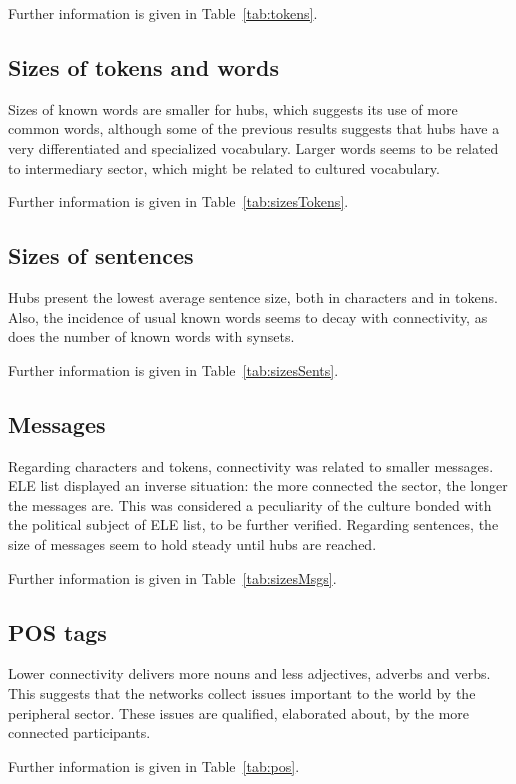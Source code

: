 \documentclass[%
 aip,
 jmp,%
 amsmath,amssymb,
 reprint,%
]{revtex4-1}
\begin{document}
Further information is given in Table~\ref{tab:tokens}.

\subsection{Sizes of tokens and words}\label{subsec:tw2}
Sizes of known words are smaller for hubs, which suggests its use of more common words, although some of the previous results suggests that hubs have a very differentiated and specialized vocabulary. Larger words seems to be related to intermediary sector, which might be related to cultured vocabulary.

Further information is given in Table~\ref{tab:sizesTokens}.

\subsection{Sizes of sentences}\label{subsec:ss}
Hubs present the lowest average sentence size, both in characters and in tokens. Also, the incidence of usual known words seems to decay with connectivity, as does the number of known words with synsets.

Further information is given in Table~\ref{tab:sizesSents}.

\subsection{Messages}\label{subsec:mm}
Regarding characters and tokens, connectivity was related to smaller messages. ELE list displayed an inverse situation: the more connected the sector, the longer the messages are. This was considered a peculiarity of the culture bonded with the political subject of ELE list, to be further verified. Regarding sentences, the size of messages seem to hold steady until hubs are reached.

Further information is given in Table~\ref{tab:sizesMsgs}.

\subsection{POS tags}\label{subsec:pos}
Lower connectivity delivers more nouns and less adjectives, adverbs and verbs. This suggests that the networks collect issues important to the world by the peripheral sector. These issues are qualified, elaborated about, by the more connected participants.

Further information is given in Table~\ref{tab:pos}.
\end{document}
